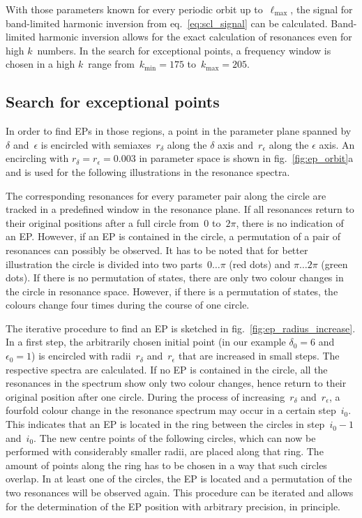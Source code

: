 \documentclass[doublecol]{epl2}
\begin{document}
With those parameters known for every periodic orbit up to~$\ell_\mathrm{max}$, the signal for band-limited harmonic inversion from eq.~\eqref{eq:scl_signal} can be calculated. Band-limited harmonic inversion allows for the exact calculation of resonances even for high $k$~numbers. In the search for exceptional points, a frequency window is chosen in a high $k$~range from~$k_\mathrm{min} = 175$ to~$k_\mathrm{max} = 205$.

\subsection{Search for exceptional points}
In order to find EPs in those regions, a point in the parameter plane spanned by~$\delta$ and~$\epsilon$ is encircled with semiaxes~$r_\delta$ along the $\delta$ axis and~$r_\epsilon$ along the $\epsilon$ axis. An encircling with $r_\delta = r_\epsilon = 0.003$ in parameter space is shown in fig.~\ref{fig:ep_orbit}a and is used for the following illustrations in the resonance spectra.

The corresponding resonances for every parameter pair along the circle are tracked in a predefined window in the resonance plane. If all resonances return to their original positions after a full circle from~$0$ to~$2\pi$, there is no indication of an EP. However, if an EP is contained in the circle, a permutation of a pair of resonances can possibly be observed. It has to be noted that for better illustration the circle is divided into two parts~$0 \dots \pi$ (red dots) and $\pi \dots 2\pi$ (green dots). If there is no permutation of states, there are only two colour changes in the circle in resonance space. However, if there is a permutation of states, the colours change four times during the course of one circle.

The iterative procedure to find an EP is sketched in fig.~\ref{fig:ep_radius_increase}. In a first step, the arbitrarily chosen initial point (in our example $\delta_0 = 6$ and $\epsilon_0 = 1$) is encircled with radii~$r_\delta$ and~$r_\epsilon$ that are increased in small steps. The respective spectra are calculated. If no EP is contained in the circle, all the resonances in the spectrum show only two colour changes, hence return to their original position after one circle. During the process of increasing~$r_\delta$ and~$r_\epsilon$, a fourfold colour change in the resonance spectrum may occur in a certain step~$i_0$. This indicates that an EP is located in the ring between the circles in step~$i_0 - 1$ and~$i_0$. The new centre points of the following circles, which can now be performed with considerably smaller radii, are placed along that ring. The amount of points along the ring has to be chosen in a way that such circles overlap. In at least one of the circles, the EP is located and a permutation of the two resonances will be observed again. This procedure can be iterated and allows for the determination of the EP position with arbitrary precision, in principle.
\end{document}
